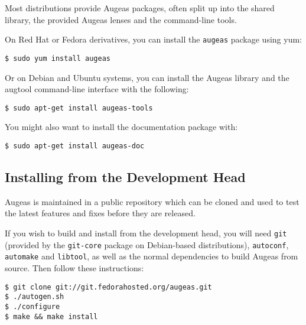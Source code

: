 
Most distributions provide Augeas packages, often split up into the shared library, the provided Augeas lenses and the command-line tools.

On Red Hat or Fedora derivatives, you can install the \verb!augeas! package using yum:

\begin{verbatim}
$ sudo yum install augeas
\end{verbatim}

Or on Debian and Ubuntu systems, you can install the Augeas library and the augtool command-line interface with the following:

\begin{verbatim}
$ sudo apt-get install augeas-tools
\end{verbatim}

You might also want to install the documentation package with:

\begin{verbatim}
$ sudo apt-get install augeas-doc
\end{verbatim}

\subsection*{Installing from the Development Head}


Augeas is maintained in a public repository which can be cloned and used to test the latest features and fixes before they are released.

If you wish to build and install from the development head, you will need \verb!git! (provided by the \verb!git-core! package on Debian-based distributions), \verb!autoconf!, \verb!automake! and \verb!libtool!, as well as the normal dependencies to build Augeas from source. Then follow these instructions:

\begin{verbatim}
$ git clone git://git.fedorahosted.org/augeas.git
$ ./autogen.sh
$ ./configure
$ make && make install
\end{verbatim}
